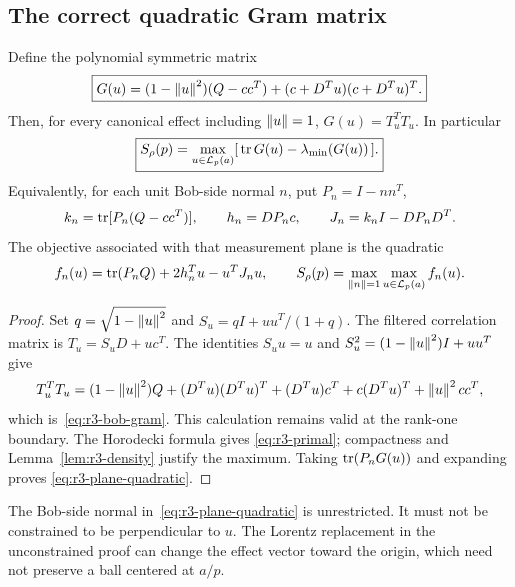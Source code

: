\subsection{The correct quadratic Gram matrix}

\begin{theorem}
\label{thm:r3-gram}
Define the polynomial symmetric matrix
\begin{equation}
 \boxed{
 G(u)=(1-\left\lVert u\right\rVert^2)(Q-cc^T)
             +(c+D^Tu)(c+D^Tu)^T.
 }
 \label{eq:r3-bob-gram}
\end{equation}
Then, for every canonical effect including $\left\lVert u\right\rVert=1$,
$G(u)=T_u^TT_u$. In particular
\begin{equation}
 \boxed{
 S_\rho(p)=\max_{u\in\mathcal L_p(a)}
       [\,\operatorname{tr} G(u)-\lambda_{\min}(G(u))\,].
 }
 \label{eq:r3-primal}
\end{equation}
Equivalently, for each unit Bob-side normal $n$, put $P_n=I-nn^T$,
\[
 k_n=\operatorname{tr}[P_n(Q-cc^T)],\qquad
 h_n=DP_nc,\qquad J_n=k_nI-DP_nD^T.
\]
The objective associated with that measurement plane is the quadratic
\begin{equation}
 f_n(u)=\operatorname{tr}(P_nQ)+2h_n^Tu-u^TJ_nu,
 \qquad
 S_\rho(p)=\max_{\left\lVert n\right\rVert=1}\max_{u\in\mathcal L_p(a)}f_n(u).
 \label{eq:r3-plane-quadratic}
\end{equation}
\end{theorem}

\begin{proof}
Set $q=\sqrt{1-\left\lVert u\right\rVert^2}$ and
$S_u=qI+uu^T/(1+q)$.
The filtered correlation matrix is $T_u=S_uD+uc^T$.
The identities $S_uu=u$ and $S_u^2=(1-\left\lVert u\right\rVert^2)I+uu^T$
give
\[
 T_u^TT_u=(1-\left\lVert u\right\rVert^2)Q
  +(D^Tu)(D^Tu)^T+(D^Tu)c^T+c(D^Tu)^T+\left\lVert u\right\rVert^2cc^T,
\]
which is~\eqref{eq:r3-bob-gram}. This calculation remains valid at
the rank-one boundary. The Horodecki formula gives
\eqref{eq:r3-primal}; compactness and
Lemma~\ref{lem:r3-density} justify the maximum.
Taking $\operatorname{tr}(P_nG(u))$ and expanding proves
\eqref{eq:r3-plane-quadratic}.
\end{proof}

The Bob-side normal in~\eqref{eq:r3-plane-quadratic} is unrestricted.
It must not be constrained to be perpendicular to $u$.
The Lorentz replacement in the unconstrained proof can change the
effect vector toward the origin, which need not preserve a ball centered
at $a/p$.

